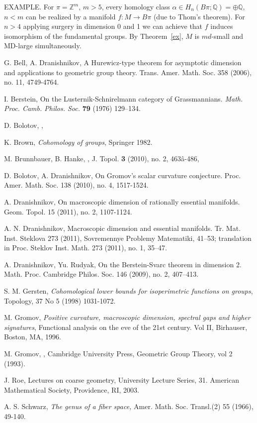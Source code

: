 \documentclass[12pt]{amsart}
\theoremstyle{plain}
\theoremstyle{definition}
\begin{document}
EXAMPLE. For $\pi=\mathbb Z^m$, $m>5$, every homology class $\alpha\in H_n(B\pi;\mathbb Q)=\oplus\mathbb Q$, $n<m$  can be realized by a manifold $f:M\to B\pi$ (due to Thom's theorem). For $n>4$ applying surgery in dimension 0 and 1 we can achieve that $f$ induces isomorphism of the fundamental groups. By Theorem~\ref{ex}, $M$ is $md$-small and MD-large simultaneously.

\begin{thebibliography}{[GL]a}

 G. Bell, A. Dranishnikov, 
A Hurewicz-type theorem for asymptotic dimension and applications to geometric group theory. Trans. Amer. Math. Soc. 358 (2006), no. 11, 4749-4764.

 I. Berstein,  On the Lusternik-Schnirelmann
category of Grassmannians.  {\em Math. Proc. Camb. Philos. Soc.}
\textbf{79} (1976) 129--134.

    D. Bolotov,
,

 K. Brown, {\em Cohomology of groups}, Springer 1982.

M. Brunnbauer, B. Hanke,
,
J. Topol. {\bf 3} (2010), no. 2, 463â-486,

  D. Bolotov, A. Dranishnikov, On Gromov's scalar curvature conjecture. Proc. Amer. Math. Soc. 138 (2010), no. 4, 1517-1524.

  A. Dranishnikov,  On macroscopic dimension of rationally essential manifolds. Geom. Topol. 15 (2011), no. 2, 1107-1124.

 A. N. Dranishnikov,  Macroscopic dimension and essential manifolds. Tr. Mat. Inst. Steklova 273 (2011), Sovremennye Problemy Matematiki, 41--53; translation in Proc. Steklov Inst. Math. 273 (2011), no. 1, 35--47. 

 A. Dranishnikov, Yu. Rudyak,  On the Berstein-Svarc theorem in dimension 2. Math. Proc. Cambridge Philos. Soc. 146 (2009), no. 2, 407--413.

 S. M. Gersten, {\em Cohomological lower bounds for isoperimetric functions on groups},
Topology, 37 No 5 (1998) 1031-1072.

    M. Gromov,  {\em Positive curvature, macroscopic dimension, spectral
gaps and higher signatures}, Functional analysis on the eve of the
21st century. Vol II, Birhauser, Boston, MA, 1996.

    M. Gromov, ,
Cambridge University Press, Geometric Group Theory, vol 2 (1993).

 J. Roe, Lectures on coarse geometry,  University Lecture Series, 31. American Mathematical Society, Providence, RI, 2003. 

 A. S. Schwarz, {\em The genus of a fiber space,} Amer. Math. Soc. Transl.(2) 55 (1966), 49-140.

\end{thebibliography}
\end{document}
